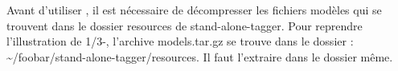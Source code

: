 \documentclass[manual-fr.tex]{subfiles}
\begin{document}
Avant d'utiliser \SEM, il est nécessaire de décompresser les fichiers modèles
qui se trouvent dans le dossier resources de stand-alone-tagger. Pour
reprendre l'illustration de 1/3-, l'archive models.tar.gz se trouve dans le
dossier : \~{}/foobar/stand-alone-tagger/resources. Il faut l'extraire dans le
dossier même.
\end{document}

